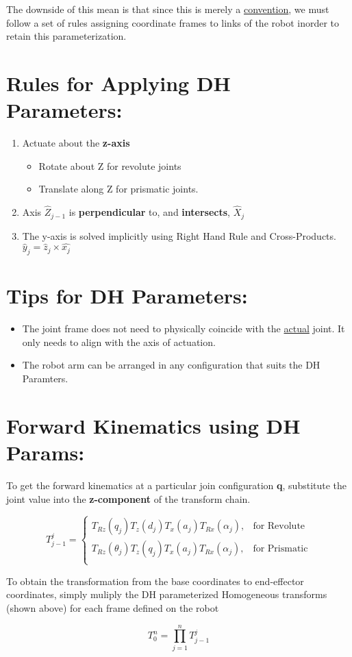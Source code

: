 \documentclass[12px]{article}
\begin{document}
\noindent The downside of this mean is that since this is merely a \underline{convention}, we must follow a set of rules assigning coordinate frames to links of the robot inorder to retain this parameterization.


\section*{Rules for Applying DH Parameters:}


\begin{enumerate}
    \item Actuate about the \textbf{z-axis}
    \begin{itemize}
        \item Rotate about Z for revolute joints
        \item Translate along Z for prismatic joints.
    \end{itemize}

    \item Axis $\hat{Z}_{j-1} $ is \textbf{perpendicular} to, and \textbf{intersects}, $\hat{X}_{j}$

    \item The y-axis is solved implicitly using Right Hand Rule and Cross-Products. $\hat{y}_j = \hat{z}_j \times \hat{x_j}$

\end{enumerate}


\section*{Tips for DH Parameters:}

\begin{itemize}
    \item The joint frame does not need to physically coincide with the \underline{actual} joint. It only needs to align with the axis of actuation.
    \item The robot arm can be arranged in any configuration that suits the DH Paramters.
\end{itemize}


\section*{Forward Kinematics using DH Params:}

To get the forward kinematics at a particular join configuration \textbf{q}, substitute the joint value into the \textbf{z-component} of the transform chain.

$$
T^{j}_{j-1} =
\begin{cases}
    T_{Rz}(q_j)T_{z}(d_j)T_{x}(a_j)T_{Rx}(\alpha_j) , & \text{for Revolute} \\
    T_{Rz}(\theta_j)T_{z}(q_j)T_{x}(a_j)T_{Rx}(\alpha_j) , & \text{for Prismatic} \\
\end{cases}
$$

\noindent To obtain the transformation from the base coordinates to end-effector coordinates, simply muliply the DH parameterized Homogeneous transforms (shown above) for each frame defined on the robot

$$
T_{0}^{n} = \displaystyle\prod_{j=1}^{n} T^{j}_{j-1}
$$
\end{document}
